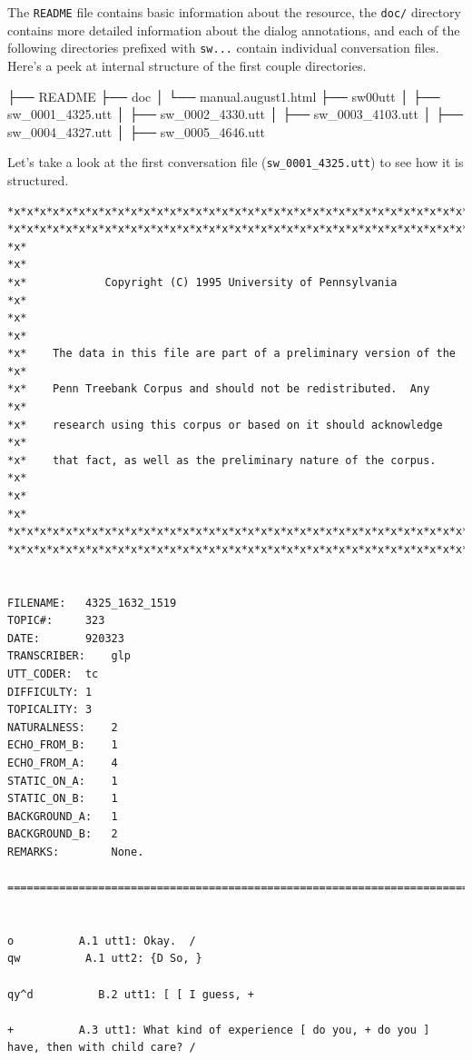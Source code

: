 \documentclass[
]{article}
\newenvironment{Shaded}{\begin{snugshade}}{\end{snugshade}}
\newcommand{\ExtensionTok}[1]{#1}
\newcommand{\NormalTok}[1]{#1}
\begin{document}
The \texttt{README} file contains basic information about the resource, the \texttt{doc/} directory contains more detailed information about the dialog annotations, and each of the following directories prefixed with \texttt{sw...} contain individual conversation files. Here's a peek at internal structure of the first couple directories.

\begin{Shaded}
\begin{Highlighting}[]
\ExtensionTok{├──}\NormalTok{ README}
\ExtensionTok{├──}\NormalTok{ doc}
\ExtensionTok{│}\NormalTok{   └── manual.august1.html}
\ExtensionTok{├──}\NormalTok{ sw00utt}
\ExtensionTok{│}\NormalTok{   ├── sw\_0001\_4325.utt}
\ExtensionTok{│}\NormalTok{   ├── sw\_0002\_4330.utt}
\ExtensionTok{│}\NormalTok{   ├── sw\_0003\_4103.utt}
\ExtensionTok{│}\NormalTok{   ├── sw\_0004\_4327.utt}
\ExtensionTok{│}\NormalTok{   ├── sw\_0005\_4646.utt}
\end{Highlighting}
\end{Shaded}

Let's take a look at the first conversation file (\texttt{sw\_0001\_4325.utt}) to see how it is structured.

\begin{verbatim}
*x*x*x*x*x*x*x*x*x*x*x*x*x*x*x*x*x*x*x*x*x*x*x*x*x*x*x*x*x*x*x*x*x*x*x*x*x*
*x*x*x*x*x*x*x*x*x*x*x*x*x*x*x*x*x*x*x*x*x*x*x*x*x*x*x*x*x*x*x*x*x*x*x*x*x*
*x*                                                                     *x*
*x*            Copyright (C) 1995 University of Pennsylvania            *x*
*x*                                                                     *x*
*x*    The data in this file are part of a preliminary version of the   *x*
*x*    Penn Treebank Corpus and should not be redistributed.  Any       *x*
*x*    research using this corpus or based on it should acknowledge     *x*
*x*    that fact, as well as the preliminary nature of the corpus.      *x*
*x*                                                                     *x*
*x*x*x*x*x*x*x*x*x*x*x*x*x*x*x*x*x*x*x*x*x*x*x*x*x*x*x*x*x*x*x*x*x*x*x*x*x*
*x*x*x*x*x*x*x*x*x*x*x*x*x*x*x*x*x*x*x*x*x*x*x*x*x*x*x*x*x*x*x*x*x*x*x*x*x*


FILENAME:   4325_1632_1519
TOPIC#:     323
DATE:       920323
TRANSCRIBER:    glp
UTT_CODER:  tc
DIFFICULTY: 1
TOPICALITY: 3
NATURALNESS:    2
ECHO_FROM_B:    1
ECHO_FROM_A:    4
STATIC_ON_A:    1
STATIC_ON_B:    1
BACKGROUND_A:   1
BACKGROUND_B:   2
REMARKS:        None.

=========================================================================
  

o          A.1 utt1: Okay.  /
qw          A.1 utt2: {D So, }   

qy^d          B.2 utt1: [ [ I guess, +   

+          A.3 utt1: What kind of experience [ do you, + do you ] have, then with child care? /
\end{verbatim}
\end{document}
